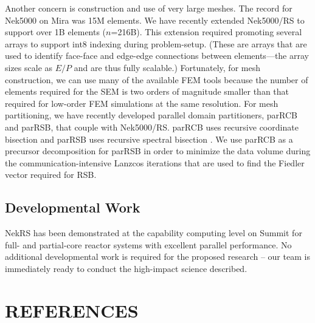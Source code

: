 Another concern is construction and use of very large meshes.  The record
for Nek5000 on Mira was 15M elements.  We have recently extended Nek5000/RS
to support over 1B elements ($n$=216B).   This extension required promoting
several arrays to support int8 indexing during problem-setup.  (These
are arrays that are used to identify face-face and edge-edge connections
between elements---the array sizes scale as $E/P$ and are thus fully
scalable.)   Fortunately, for mesh construction, we can use many of the 
available FEM tools because the number of elements required for the SEM
is two orders of magnitude smaller than that required for low-order FEM 
simulations at the same resolution.
For mesh partitioning, we have recently developed parallel domain partitioners,
parRCB and parRSB, that couple with Nek5000/RS.  parRCB uses recursive
coordinate bisection and parRSB uses recursive spectral bisection
\cite{pothen90}.  We use parRCB as a precursor decomposition for parRSB in
order to minimize the data volume during the communication-intensive Lanzcos
iterations that are used to find the Fiedler vector required for RSB.



\vspace{-.25in}
\subsection{Developmental Work}
\vspace{-.2in}


NekRS has been demonstrated at the capability computing level on Summit
for full- and partial-core reactor systems with excellent parallel performance.
No additional developmental work is required for the proposed research -- our
team is immediately ready to conduct the high-impact science described.

\clearpage
\vspace{-.15in}
\section{REFERENCES}
\vspace{-.15in}

